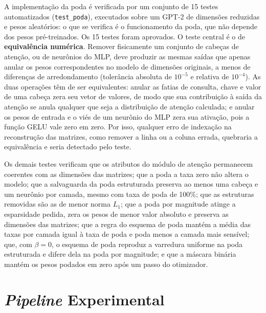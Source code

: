 A implementação da poda é verificada por um conjunto de 15 testes automatizados
(\texttt{test\_poda}), executados sobre um GPT-2 de dimensões reduzidas e pesos
aleatórios: o que se verifica é o funcionamento da poda, que não depende dos pesos
pré-treinados. Os 15 testes foram aprovados.
O teste central é o de \textbf{equivalência
numérica}. Remover fisicamente um conjunto de cabeças de atenção, ou de neurônios do MLP,
deve produzir as mesmas saídas que apenas anular os pesos correspondentes no modelo de
dimensões originais, a menos de diferenças de arredondamento (tolerância absoluta de
$10^{-5}$ e relativa de $10^{-4}$). As duas operações têm de ser equivalentes: anular as
fatias de consulta, chave e valor de uma cabeça zera seu vetor de valores, de modo que sua
contribuição à saída da atenção se anula qualquer que seja a distribuição de atenção
calculada; e anular os pesos de entrada e o viés de um neurônio do MLP zera sua ativação,
pois a função GELU vale zero em zero. Por isso, qualquer erro de indexação na reconstrução
das matrizes, como remover a linha ou a coluna errada, quebraria a equivalência e seria
detectado pelo teste.

Os demais testes verificam que os atributos do módulo de atenção permanecem coerentes com
as dimensões das matrizes; que a poda a taxa zero não altera o modelo; que a salvaguarda da
poda estruturada preserva ao menos uma cabeça e um
neurônio por camada, mesmo com taxa de poda de 100\%; que as estruturas removidas são as
de menor norma $L_1$; que a poda por magnitude atinge a esparsidade pedida, zera os pesos
de menor valor absoluto e preserva as dimensões das matrizes; que a regra do esquema de poda mantém
a média das taxas por camada igual à taxa de poda e poda menos a camada mais sensível; que,
com $\beta = 0$, o esquema de poda reproduz a varredura uniforme na poda estruturada e difere dela
na poda por magnitude; e que a máscara binária mantém os pesos
podados em zero após um passo do otimizador.

\section{\textit{Pipeline} Experimental}\label{sec:pipeline}

